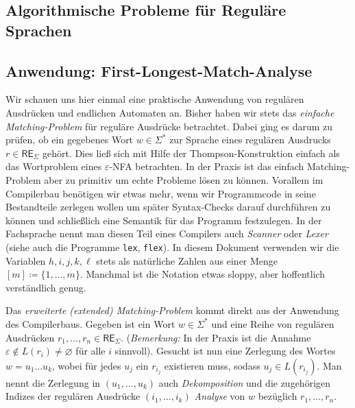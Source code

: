 \documentclass[11pt, a4paper]{article}
\theoremstyle{definition}
\theoremstyle{plain}
\numberwithin{equation}{section}
\let\emptyset\varnothing
\begin{document}
\subsection{Algorithmische Probleme für Reguläre Sprachen}\label{sec:regular_algorithms}


\subsection{Anwendung: First-Longest-Match-Analyse}\label{sec:regular_first-longest-match}
Wir schauen uns hier einmal eine praktische Anwendung von regulären Ausdrücken und endlichen Automaten an. Bisher haben wir stets das \textit{einfache Matching-Problem} für reguläre Ausdrücke betrachtet. Dabei ging es darum zu prüfen, ob ein gegebenes Wort $w \in \Sigma^\ast$ zur Sprache eines regulären Ausdrucks $r \in \mathsf{RE}_\Sigma$ gehört. Dies ließ sich mit Hilfe der Thompson-Konstruktion einfach als das Wortproblem eines $\varepsilon$-NFA betrachten. In der Praxis ist das einfach Matching-Problem aber zu primitiv um echte Probleme lösen zu können. Vorallem im Compilerbau benötigen wir etwas mehr, wenn wir Programmcode in seine Bestandteile zerlegen wollen um später Syntax-Checks darauf durchführen zu können und schließlich eine Semantik für das Programm festzulegen. In der Fachsprache nennt man diesen Teil eines Compilers auch \textit{Scanner} oder \textit{Lexer} (siehe auch die Programme \texttt{lex}, \texttt{flex}).
In diesem Dokument verwenden wir die Variablen $h, i, j, k, \ell$ stets als natürliche Zahlen aus einer Menge $[m] \coloneqq \{ 1, \ldots, m \}$. Manchmal ist die Notation etwas sloppy, aber hoffentlich verständlich genug.


Das \textit{erweiterte (extended) Matching-Problem} kommt direkt aus der Anwendung des Compilerbaus. Gegeben ist ein Wort $w \in \Sigma^\ast$ und eine Reihe von regulären Ausdrücken $r_1, \ldots, r_n \in \mathsf{RE}_\Sigma$. (\textit{Bemerkung:} In der Praxis ist die Annahme $\varepsilon \notin L(r_i) \neq \emptyset$ für alle $i$ sinnvoll). Gesucht ist nun eine Zerlegung des Wortes $w = u_1 \ldots u_k$, wobei für jedes $u_j$ ein $r_{i_j}$ existieren muss, sodass $u_j \in L(r_{i_j})$. Man nennt die Zerlegung in $(u_1, \ldots, u_k)$ auch \textit{Dekomposition} und die zugehörigen Indizes der regulären Ausdrücke $(i_1, \ldots, i_k)$ \textit{Analyse} von $w$ bezüglich $r_1, \ldots, r_n$.
\end{document}

